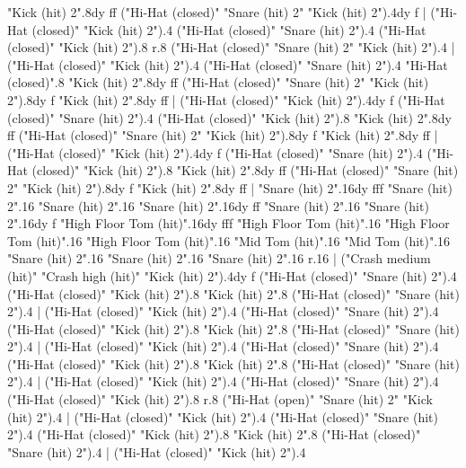       "Kick (hit) 2".8{dy ff}
      ("Hi-Hat (closed)" "Snare (hit) 2" "Kick (hit) 2").4{dy f}
    |
      ("Hi-Hat (closed)" "Kick (hit) 2").4
      ("Hi-Hat (closed)" "Snare (hit) 2").4
      ("Hi-Hat (closed)" "Kick (hit) 2").8
      r.8
      ("Hi-Hat (closed)" "Snare (hit) 2" "Kick (hit) 2").4
    |
      ("Hi-Hat (closed)" "Kick (hit) 2").4
      ("Hi-Hat (closed)" "Snare (hit) 2").4
      "Hi-Hat (closed)".8
      "Kick (hit) 2".8{dy ff}
      ("Hi-Hat (closed)" "Snare (hit) 2" "Kick (hit) 2").8{dy f}
      "Kick (hit) 2".8{dy ff}
    |
      ("Hi-Hat (closed)" "Kick (hit) 2").4{dy f}
      ("Hi-Hat (closed)" "Snare (hit) 2").4
      ("Hi-Hat (closed)" "Kick (hit) 2").8
      "Kick (hit) 2".8{dy ff}
      ("Hi-Hat (closed)" "Snare (hit) 2" "Kick (hit) 2").8{dy f}
      "Kick (hit) 2".8{dy ff}
    |
      ("Hi-Hat (closed)" "Kick (hit) 2").4{dy f}
      ("Hi-Hat (closed)" "Snare (hit) 2").4
      ("Hi-Hat (closed)" "Kick (hit) 2").8
      "Kick (hit) 2".8{dy ff}
      ("Hi-Hat (closed)" "Snare (hit) 2" "Kick (hit) 2").8{dy f}
      "Kick (hit) 2".8{dy ff}
    |
      "Snare (hit) 2".16{dy fff}
      "Snare (hit) 2".16
      "Snare (hit) 2".16
      "Snare (hit) 2".16{dy ff}
      "Snare (hit) 2".16
      "Snare (hit) 2".16{dy f}
      "High Floor Tom (hit)".16{dy fff}
      "High Floor Tom (hit)".16
      "High Floor Tom (hit)".16
      "High Floor Tom (hit)".16
      "Mid Tom (hit)".16
      "Mid Tom (hit)".16
      "Snare (hit) 2".16
      "Snare (hit) 2".16
      "Snare (hit) 2".16
      r.16
    |
      ("Crash medium (hit)" "Crash high (hit)" "Kick (hit) 2").4{dy f}
      ("Hi-Hat (closed)" "Snare (hit) 2").4
      ("Hi-Hat (closed)" "Kick (hit) 2").8
      "Kick (hit) 2".8
      ("Hi-Hat (closed)" "Snare (hit) 2").4
    |
      ("Hi-Hat (closed)" "Kick (hit) 2").4
      ("Hi-Hat (closed)" "Snare (hit) 2").4
      ("Hi-Hat (closed)" "Kick (hit) 2").8
      "Kick (hit) 2".8
      ("Hi-Hat (closed)" "Snare (hit) 2").4
    |
      ("Hi-Hat (closed)" "Kick (hit) 2").4
      ("Hi-Hat (closed)" "Snare (hit) 2").4
      ("Hi-Hat (closed)" "Kick (hit) 2").8
      "Kick (hit) 2".8
      ("Hi-Hat (closed)" "Snare (hit) 2").4
    |
      ("Hi-Hat (closed)" "Kick (hit) 2").4
      ("Hi-Hat (closed)" "Snare (hit) 2").4
      ("Hi-Hat (closed)" "Kick (hit) 2").8
      r.8
      ("Hi-Hat (open)" "Snare (hit) 2" "Kick (hit) 2").4
    |
      ("Hi-Hat (closed)" "Kick (hit) 2").4
      ("Hi-Hat (closed)" "Snare (hit) 2").4
      ("Hi-Hat (closed)" "Kick (hit) 2").8
      "Kick (hit) 2".8
      ("Hi-Hat (closed)" "Snare (hit) 2").4
    |
      ("Hi-Hat (closed)" "Kick (hit) 2").4
